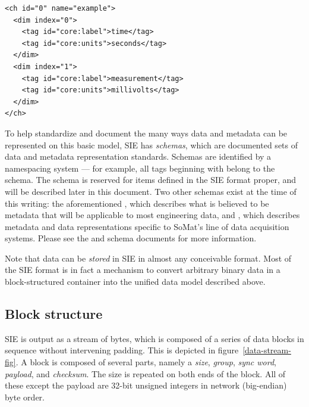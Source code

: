 \documentclass{article}
\begin{document}
\begin{lstlisting}[language=siexml]
<ch id="0" name="example">
  <dim index="0">
    <tag id="core:label">time</tag>
    <tag id="core:units">seconds</tag>
  </dim>
  <dim index="1">
    <tag id="core:label">measurement</tag>
    <tag id="core:units">millivolts</tag>
  </dim>
</ch>
\end{lstlisting}

To help standardize and document the many ways data and metadata can
be represented on this basic model, SIE has \emph{schemas}, which are
documented sets of data and metadata representation standards.
Schemas are identified by a namespacing system --- for example, all
tags beginning with  belong to the  schema.  The
 schema is reserved for items defined in the SIE format
proper, and will be described later in this document.  Two other
schemas exist at the time of this writing:  the aforementioned
, which describes what is believed to be metadata that will
be applicable to most engineering data, and , which
describes metadata and data representations specific to SoMat's line
of data acquisition systems.  Please see the  and
 schema documents for more information.

Note that data can be \emph{stored} in SIE in almost any conceivable
format.  Most of the SIE format is in fact a mechanism to convert
arbitrary binary data in a block-structured container into the unified
data model described above.

\subsection{Block structure}
\label{block-structure-sec}

SIE is output as a stream of bytes, which is composed of a series of
data blocks in sequence without intervening padding.  This is depicted
in figure~\ref{data-stream-fig}.  A block is composed of several
parts, namely a \emph{size}, \emph{group}, \emph{sync word},
\emph{payload}, and \emph{checksum}.  The size is repeated on both
ends of the block.  All of these except the payload are 32-bit
unsigned integers in network (big-endian) byte order.

\def\blockline{
  size & group & sync & 
  \hspace{1cm}payload\hspace{1cm} 
  & check & size \\ \hline
}
\def\blockstructure{
  \begin{center}
    \begin{tabular}{|c|c|c|c|c|c|}    \hline
      \blockline
      \blockline
      \multicolumn{6}{c}{$\cdots$} \\ \hline
      \blockline
    \end{tabular}
  \end{center}
}
\end{document}
